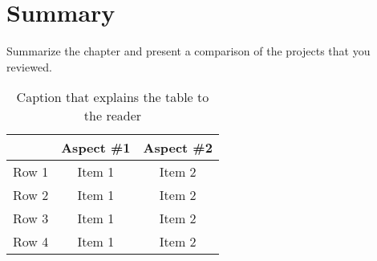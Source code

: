 \section{Summary}

Summarize the chapter and present a comparison of the projects that you reviewed.

\begin{table}[!h]
\begin{center}
	\begin{tabular}{|l|c|c|} 
	\hline
 	\bf  & \bf Aspect \#1  & \bf Aspect \#2 \\
  	\hline
	Row 1 & Item 1 & Item 2 \\
	Row 2 & Item 1 & Item 2 \\
	Row 3 & Item 1 & Item 2 \\
	Row 4 & Item 1 & Item 2 \\
	\hline
	\end{tabular}
\end{center}
\caption[Comparison of Closely-Related Projects]{Caption that explains the table to the reader}	
\label{tab:SummaryProjects}
\end{table}
